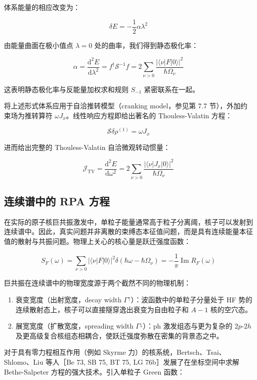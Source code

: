 体系能量的相应改变为：

\begin{equation}
\delta E=-\frac{1}{2}\alpha\lambda^{2}\label{eq:linresp_energy_second_order}
\end{equation}

由能量曲面在极小值点 $\lambda=0$ 处的曲率，我们得到静态极化率：

\begin{equation}
\alpha=\frac{\mathrm{d}^{2}E}{\mathrm{d}\lambda^{2}}=f^{\dagger}\mathcal{S}^{-1}f=2\sum_{\nu>0}\frac{|\langle\nu|F|0\rangle|^{2}}{\hbar\Omega_{\nu}}\label{eq:linresp_polarizability_sum_rule}
\end{equation}

这表明静态极化率与反能量加权求和规则 $S_{-1}$ 紧密联系在一起。

将上述形式体系应用于自洽推转模型（cranking model，参见第 7.7 节），外加约束场为推转算符 $\omega J_{x}$。线性响应方程即给出著名的
Thouless-Valatin 方程：

\begin{equation}
\mathcal{S}\delta\rho^{(1)}=\omega J_{x}\label{eq:linresp_tv_cranking_eq}
\end{equation}

进而给出完整的 Thouless-Valatin 自洽微观转动惯量：

\begin{equation}
\mathcal{J}_{\text{TV}}=\frac{\mathrm{d}^{2}E}{\mathrm{d}\omega^{2}}=2\sum_{\nu>0}\frac{|\langle\nu|J_{x}|0\rangle|^{2}}{\hbar\Omega_{\nu}}\label{eq:linresp_thouless_valatin_inertia}
\end{equation}


\subsection{连续谱中的 RPA 方程\label{subsec:8.5.4_=008FDE=007EED=008C31=004E2D=007684RPA=0065B9=007A0B}}

在实际的原子核巨共振激发中，单粒子能量通常高于粒子分离阈，核子可以发射到连续谱中。因此，真实问题并非离散的束缚态本征值问题，而是具有连续能量本征值的散射与共振问题。物理上关心的核心量是跃迁强度函数：

\begin{equation}
S_{F}(\omega)=\sum_{\nu>0}|\langle\nu|F|0\rangle|^{2}\delta(\hbar\omega-\hbar\Omega_{\nu})=-\frac{1}{\pi}\operatorname{Im}R_{F}(\omega)\label{eq:linresp_strength_function_im_r}
\end{equation}

巨共振在连续谱中的物理宽度源于两个截然不同的物理机制：
\begin{enumerate}
\item 衰变宽度（出射宽度，decay width $\Gamma^{\uparrow}$）：波函数中的单粒子分量处于 HF 势的连续散射态上，核子可以直接隧穿逸出衰变为自由粒子和
$A-1$ 核的空穴态。
\item 展宽宽度（扩散宽度，spreading width $\Gamma^{\downarrow}$）：ph 激发组态与更为复杂的 $2p\text{-}2h$
及更高级复合核组态相耦合，使跃迁强度弥散在密集的背景态之中。
\end{enumerate}
对于具有零力程相互作用（例如 Skyrme 力）的核系统，Bertsch、Tsai、Shlomo、Liu 等人［Be 73, SB
75, BT 75, LG 76b］发展了在坐标空间中求解 Bethe-Salpeter 方程的强大技术。引入单粒子 Green 函数：

